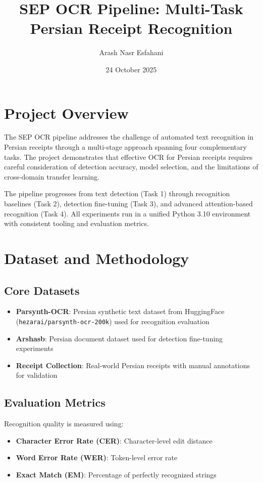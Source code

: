 \documentclass[11pt,a4paper]{article}
\title{SEP OCR Pipeline: Multi-Task Persian Receipt Recognition}
\author{Arash Nasr Esfahani}
\date{24 October 2025}
\begin{document}
\maketitle

\section{Project Overview}
The SEP OCR pipeline addresses the challenge of automated text recognition in Persian receipts through a multi-stage approach spanning four complementary tasks. The project demonstrates that effective OCR for Persian receipts requires careful consideration of detection accuracy, model selection, and the limitations of cross-domain transfer learning.

The pipeline progresses from text detection (Task 1) through recognition baselines (Task 2), detection fine-tuning (Task 3), and advanced attention-based recognition (Task 4). All experiments run in a unified Python 3.10 environment with consistent tooling and evaluation metrics.

\section{Dataset and Methodology}
\subsection{Core Datasets}
\begin{itemize}
\item \textbf{Parsynth-OCR}: Persian synthetic text dataset from HuggingFace (\texttt{hezarai/parsynth-ocr-200k}) used for recognition evaluation
\item \textbf{Arshasb}: Persian document dataset used for detection fine-tuning experiments  
\item \textbf{Receipt Collection}: Real-world Persian receipts with manual annotations for validation
\end{itemize}

\subsection{Evaluation Metrics}
Recognition quality is measured using:
\begin{itemize}
\item \textbf{Character Error Rate (CER)}: Character-level edit distance
\item \textbf{Word Error Rate (WER)}: Token-level error rate
\item \textbf{Exact Match (EM)}: Percentage of perfectly recognized strings
\end{itemize}
\end{document}

